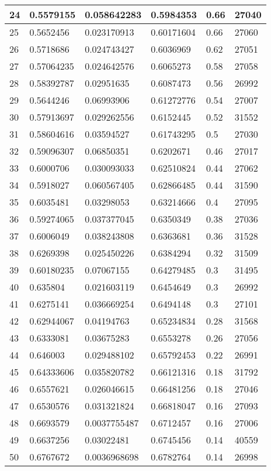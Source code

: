 \begin{longtable}{|l|l|l|l|l|l|}
24 & 0.5579155 & 0.058642283 & 0.5984353 & 0.66 & 27040 \\ \hline 
25 & 0.5652456 & 0.023170913 & 0.60171604 & 0.66 & 27060 \\ \hline 
26 & 0.5718686 & 0.024743427 & 0.6036969 & 0.62 & 27051 \\ \hline 
27 & 0.57064235 & 0.024642576 & 0.6065273 & 0.58 & 27058 \\ \hline 
28 & 0.58392787 & 0.02951635 & 0.6087473 & 0.56 & 26992 \\ \hline 
29 & 0.5644246 & 0.06993906 & 0.61272776 & 0.54 & 27007 \\ \hline 
30 & 0.57913697 & 0.029262556 & 0.6152445 & 0.52 & 31552 \\ \hline 
31 & 0.58604616 & 0.03594527 & 0.61743295 & 0.5 & 27030 \\ \hline 
32 & 0.59096307 & 0.06850351 & 0.6202671 & 0.46 & 27017 \\ \hline 
33 & 0.6000706 & 0.030093033 & 0.62510824 & 0.44 & 27062 \\ \hline 
34 & 0.5918027 & 0.060567405 & 0.62866485 & 0.44 & 31590 \\ \hline 
35 & 0.6035481 & 0.03298053 & 0.63214666 & 0.4 & 27095 \\ \hline 
36 & 0.59274065 & 0.037377045 & 0.6350349 & 0.38 & 27036 \\ \hline 
37 & 0.6006049 & 0.038243808 & 0.6363681 & 0.36 & 31528 \\ \hline 
38 & 0.6269398 & 0.025450226 & 0.6384294 & 0.32 & 31509 \\ \hline 
39 & 0.60180235 & 0.07067155 & 0.64279485 & 0.3 & 31495 \\ \hline 
40 & 0.635804 & 0.021603119 & 0.6454649 & 0.3 & 26992 \\ \hline 
41 & 0.6275141 & 0.036669254 & 0.6494148 & 0.3 & 27101 \\ \hline 
42 & 0.62944067 & 0.04194763 & 0.65234834 & 0.28 & 31568 \\ \hline 
43 & 0.6333081 & 0.03675283 & 0.6553278 & 0.26 & 27056 \\ \hline 
44 & 0.646003 & 0.029488102 & 0.65792453 & 0.22 & 26991 \\ \hline 
45 & 0.64333606 & 0.035820782 & 0.66121316 & 0.18 & 31792 \\ \hline 
46 & 0.6557621 & 0.026046615 & 0.66481256 & 0.18 & 27046 \\ \hline 
47 & 0.6530576 & 0.031321824 & 0.66818047 & 0.16 & 27093 \\ \hline 
48 & 0.6693579 & 0.0037755487 & 0.6712457 & 0.16 & 27006 \\ \hline 
49 & 0.6637256 & 0.03022481 & 0.6745456 & 0.14 & 40559 \\ \hline 
50 & 0.6767672 & 0.0036968698 & 0.6782764 & 0.14 & 26998 \\ \hline 
\end{longtable}